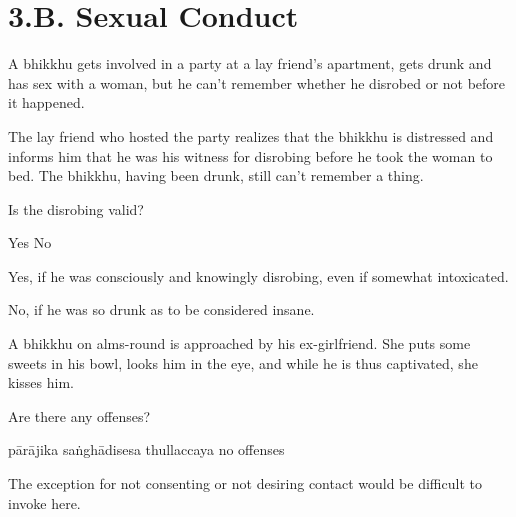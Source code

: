\chapter{3.B. Sexual Conduct}
\renewcommand*{\theChapterTitle}{3.B. Sexual Conduct}

\begin{exam}{\autoExamName}

\begin{problem}
  A bhikkhu gets involved in a party at a lay friend's apartment, gets drunk and has sex with a woman,
  but he can't remember whether he disrobed or not before it happened.

  \bigskip

  The lay friend who hosted the party realizes that the bhikkhu is distressed
  and informs him that he was his witness for disrobing
  before he took the woman to bed.
  The bhikkhu, having been drunk, still can't remember a thing.

  \bigskip

  Is the disrobing valid?

  \bigskip

  \begin{answers}{2}
    \bChoices
     Yes\eAns
     No\eAns
    \eChoices
  \end{answers}

  \begin{solution}
    Yes, if he was consciously and knowingly disrobing, even if somewhat intoxicated.

    No, if he was so drunk as to be considered insane.
  \end{solution}

\end{problem}

\problemDivide

\begin{problem}
  A bhikkhu on alms-round is approached by his ex-girlfriend. She puts some sweets in his bowl, looks him in the eye, and while he is thus captivated, she kisses him.

  Are there any offenses?

  \bigskip

  \begin{answers}{4}
    \bChoices
     pārājika\eAns
     saṅghādisesa\eAns
     thullaccaya\eAns
     no offenses\eAns
    \eChoices
  \end{answers}

  \begin{solution}
    The exception for not consenting or not desiring contact would be difficult to invoke here.


\end{solution}
\end{problem}
\end{exam}
